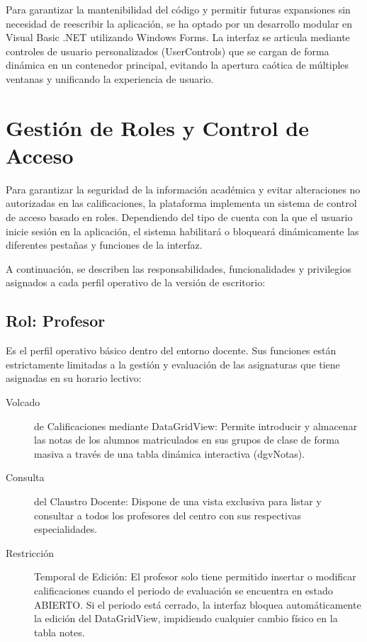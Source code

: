 \documentclass[spanish]{report}
\begin{document}
Para garantizar la mantenibilidad del código y permitir futuras expansiones
sin necesidad de reescribir la aplicación, se ha optado por un desarrollo
modular en Visual Basic .NET utilizando Windows Forms. La interfaz
se articula mediante controles de usuario personalizados (UserControls)
que se cargan de forma dinámica en un contenedor principal, evitando
la apertura caótica de múltiples ventanas y unificando la experiencia
de usuario.

\section{Gestión de Roles y Control de Acceso}

Para garantizar la seguridad de la información académica y evitar
alteraciones no autorizadas en las calificaciones, la plataforma implementa
un sistema de control de acceso basado en roles. Dependiendo del tipo
de cuenta con la que el usuario inicie sesión en la aplicación, el
sistema habilitará o bloqueará dinámicamente las diferentes pestañas
y funciones de la interfaz.

A continuación, se describen las responsabilidades, funcionalidades
y privilegios asignados a cada perfil operativo de la versión de escritorio:

\subsection{Rol: Profesor}

Es el perfil operativo básico dentro del entorno docente. Sus funciones
están estrictamente limitadas a la gestión y evaluación de las asignaturas
que tiene asignadas en su horario lectivo:
\begin{description}
\item [{Volcado}] de Calificaciones mediante DataGridView: Permite introducir
y almacenar las notas de los alumnos matriculados en sus grupos de
clase de forma masiva a través de una tabla dinámica interactiva (dgvNotas).
\item [{Consulta}] del Claustro Docente: Dispone de una vista exclusiva
para listar y consultar a todos los profesores del centro con sus
respectivas especialidades.
\item [{Restricción}] Temporal de Edición: El profesor solo tiene permitido
insertar o modificar calificaciones cuando el periodo de evaluación
se encuentra en estado \textquotedbl ABIERTO\textquotedbl . Si el
periodo está cerrado, la interfaz bloquea automáticamente la edición
del DataGridView, impidiendo cualquier cambio físico en la tabla notes.
\end{description}
\end{document}
